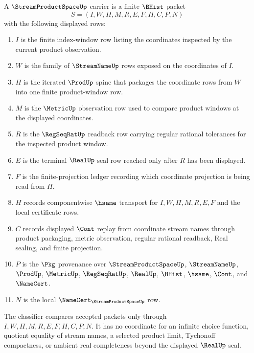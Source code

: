 \begin{definition}
\label{def:stream-product-space-carrier}
A $\StreamProductSpaceUp$ carrier is a finite $\BHist$ packet
$$
S=(I,W,\Pi,M,R,E,F,H,C,P,N)
$$
with the following displayed rows:
\begin{enumerate}
\item $I$ is the finite index-window row listing the coordinates inspected by the current product observation.
\item $W$ is the family of $\StreamNameUp$ rows exposed on the coordinates of $I$.
\item $\Pi$ is the iterated $\ProdUp$ spine that packages the coordinate rows from $W$ into one finite product-window row.
\item $M$ is the $\MetricUp$ observation row used to compare product windows at the displayed coordinates.
\item $R$ is the $\RegSeqRatUp$ readback row carrying regular rational tolerances for the inspected product window.
\item $E$ is the terminal $\RealUp$ seal row reached only after $R$ has been displayed.
\item $F$ is the finite-projection ledger recording which coordinate projection is being read from $\Pi$.
\item $H$ records componentwise $\hsame$ transport for $I,W,\Pi,M,R,E,F$ and the local certificate rows.
\item $C$ records displayed $\Cont$ replay from coordinate stream names through product packaging, metric observation, regular rational readback, Real sealing, and finite projection.
\item $P$ is the $\Pkg$ provenance over $\StreamProductSpaceUp$, $\StreamNameUp$, $\ProdUp$, $\MetricUp$, $\RegSeqRatUp$, $\RealUp$, $\BHist$, $\hsame$, $\Cont$, and $\NameCert$.
\item $N$ is the local $\NameCert_{\StreamProductSpaceUp}$ row.
\end{enumerate}
The classifier compares accepted packets only through $I,W,\Pi,M,R,E,F,H,C,P,N$. It has no coordinate for an infinite choice function, quotient equality of stream names, a selected product limit, Tychonoff compactness, or ambient real completeness beyond the displayed $\RealUp$ seal.
\end{definition}

